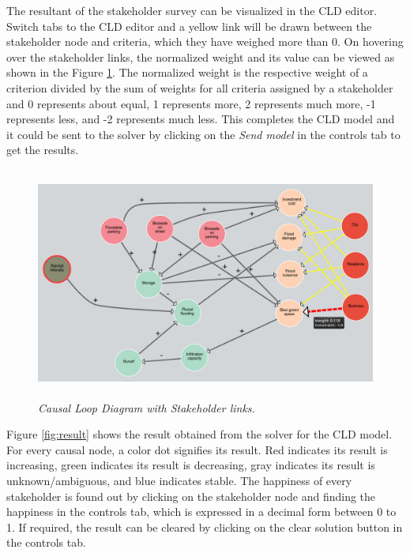 \documentclass[a4paper]{article}
\begin{document}
The resultant of the stakeholder survey can be visualized in the CLD editor. Switch tabs to the CLD editor and a yellow link will be drawn between the stakeholder node and criteria, which they have weighed more than 0. On hovering over the stakeholder links, the normalized weight and its value can be viewed as shown in the Figure \ref{fig:cld2}. The normalized weight is the respective weight of a criterion divided by the sum of weights for all criteria assigned by a stakeholder and 0 represents about equal, 1 represents more, 2 represents much more, -1 represents less, and -2 represents much less. This completes the CLD model and it could be sent to the solver by clicking on the \textit{Send model} in the controls tab to get the results.

\begin{figure}
\begin{center}
\includegraphics[height=3in,width=5in]{img/cld2.png}
\caption{\small \sl Causal Loop Diagram with Stakeholder links.\label{fig:cld2}}
\end{center}
\end{figure}

Figure \ref{fig:result} shows the result obtained from the solver for the CLD model. For every causal node, a color dot signifies its result. Red indicates its result is increasing, green indicates its result is decreasing, gray indicates its result is unknown/ambiguous, and blue indicates stable. The happiness of every stakeholder is found out by clicking on the stakeholder node and finding the happiness in the controls tab, which is expressed in a decimal form between 0 to 1. If required, the result can be cleared by clicking on the clear solution button in the controls tab.
\end{document}

